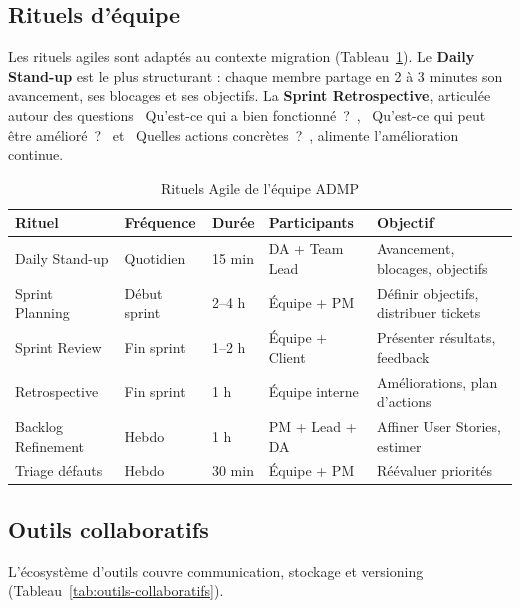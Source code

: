 \subsection{Rituels d'équipe}
\label{subsec:rituels}

Les rituels agiles sont adaptés au contexte migration (Tableau~\ref{tab:rituels}). Le \textbf{Daily Stand-up} est le plus structurant : chaque membre partage en 2 à 3 minutes son avancement, ses blocages et ses objectifs. La \textbf{Sprint Retrospective}, articulée autour des questions \og~Qu'est-ce qui a bien fonctionné~?~\fg{}, \og~Qu'est-ce qui peut être amélioré~?~\fg{} et \og~Quelles actions concrètes~?~\fg{}, alimente l'amélioration continue.

\begin{table}[H]
\centering
\caption{Rituels Agile de l'équipe ADMP}
\label{tab:rituels}
\begin{tabularx}{\textwidth}{llllX}
\toprule
\textbf{Rituel} & \textbf{Fréquence} & \textbf{Durée} & \textbf{Participants} & \textbf{Objectif} \\
\midrule
Daily Stand-up & Quotidien & 15 min & DA + Team Lead & Avancement, blocages, objectifs \\
\addlinespace
Sprint Planning & Début sprint & 2--4 h & Équipe + PM & Définir objectifs, distribuer tickets \\
\addlinespace
Sprint Review & Fin sprint & 1--2 h & Équipe + Client & Présenter résultats, feedback \\
\addlinespace
Retrospective & Fin sprint & 1 h & Équipe interne & Améliorations, plan d'actions \\
\addlinespace
Backlog Refinement & Hebdo & 1 h & PM + Lead + DA & Affiner User Stories, estimer \\
\addlinespace
Triage défauts & Hebdo & 30 min & Équipe + PM & Réévaluer priorités \\
\bottomrule
\end{tabularx}
\end{table}

\subsection{Outils collaboratifs}
\label{subsec:outils-collaboratifs}

L'écosystème d'outils couvre communication, stockage et versioning (Tableau~\ref{tab:outils-collaboratifs}).

